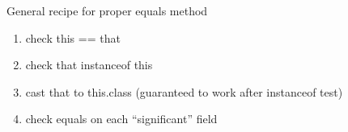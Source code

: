 \documentclass{beamer}
\begin{document}
\begin{frame}[fragile]{}


\begin{lstlisting}[language=Java]

\end{lstlisting}
General recipe for proper equals method
\begin{enumerate}
\item check this == that
\item check that instanceof this
\item cast that to this.class (guaranteed to work after instanceof test)
\item check equals on each ``significant'' field
\end{enumerate}


\end{frame}










\end{document}
